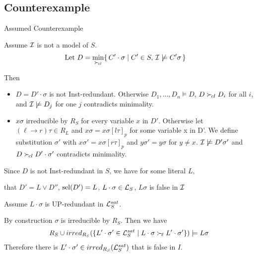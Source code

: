 \documentclass[%
handout,
]{beamer}
\begin{document}
\subsection{Counterexample}
\begin{frame}[allowframebreaks]{Assumed Counterexample}
    
    Assume $\mathcal{I}$ is not a model of $S$.
    \begin{align*}
        \text{Let }
        D &= \min_{\mathrel\succ_{\!cl}}\{\,
        C'\cdot\sigma \mid C'\in S,\,
        \mathcal{I}\not\models C'\sigma\,
        \}
    \end{align*}

    Then
    \begin{itemize}
        \item $D = D'\cdot\sigma$ is not Inst-redundant. Otherwise
        $D_1,\ldots,D_n\models D$, $D\mathrel\succ_{\!cl} D_i$ for all $i$,
        and $\mathcal{I}\not\models D_j$ for one $j$ contradicts minimality.
        \item $x\sigma$ irreducible by $R_S$ for every variable $x$ in $D'$.
        Otherwise let $(\ell\to r)\tau\in R_L$ and $x\sigma = x\sigma[l\tau]_p$ for some variable x in D'.
        We define substitution $\sigma'$ with $x\sigma' = x\sigma[r\tau]_p$ and $y\sigma' = y\sigma$ for $y\neq x$.
        $\mathcal{I}\not\models D'\sigma'$ and $D\mathrel\succ_{\!cl} D'\cdot\sigma'$ contradicts minimality.
    \end{itemize}



    Since $D$ is not Inst-redundant in $S$,
    we have for some literal $L$,

    that $D' = L\lor D''$, $\operatorname{sel}(D') = L$, $L\cdot\sigma\in\mathcal{L}_S$,
    $L\sigma$ is false in $\mathcal{I}$

    \vspace{0.7em}
    Assume $L\cdot\sigma$ is UP-redundant in $\mathcal{L}_S^{sat}$.

    \vspace{0.7em}
    By construction $\sigma$ is irreducible by $R_S$. Then we have
    \begin{align*}
        R_S \cup irred_{R_S}(
            \{
            L'\cdot\sigma'\in\mathcal{L}_S^{sat}
            \mid
            L\cdot\sigma \mathrel\succ_{\!\ell} L'\cdot\sigma'
            \}
        )
        \models
        L\sigma
    \end{align*}
    Therefore there is $L'\cdot\sigma'\in irred_{R_S}(\mathcal{L}_S^{sat})$ that is false in $I$.
    \vspace{0.7em}


\end{frame}
\end{document}
